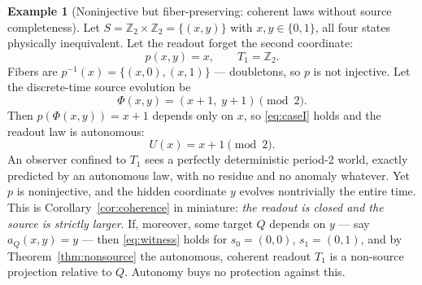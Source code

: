 \documentclass[11pt,reqno]{amsart}
\theoremstyle{plain}
\theoremstyle{definition}
\newtheorem{example}[theorem]{Example}
\theoremstyle{remark}
\begin{document}
\begin{example}[Noninjective but fiber-preserving: coherent laws without source completeness]\label{ex:fiberpreserving}
Let $S=\mathbb Z_2\times\mathbb Z_2=\{(x,y)\}$ with $x,y\in\{0,1\}$, all four states physically inequivalent. Let the readout forget the second coordinate:
\[
p(x,y)=x,\qquad T_1=\mathbb Z_2 .
\]
Fibers are $p^{-1}(x)=\{(x,0),(x,1)\}$ --- doubletons, so $p$ is not injective. Let the discrete-time source evolution be
\[
\Phi(x,y)=(x+1,\;y+1)\pmod 2 .
\]
Then $p(\Phi(x,y))=x+1$ depends only on $x$, so \eqref{eq:caseI} holds and the readout law is autonomous:
\[
U(x)=x+1\pmod 2 .
\]
An observer confined to $T_1$ sees a perfectly deterministic period-2 world, exactly predicted by an autonomous law, with no residue and no anomaly whatever. Yet $p$ is noninjective, and the hidden coordinate $y$ evolves nontrivially the entire time. This is Corollary~\ref{cor:coherence} in miniature: \emph{the readout is closed and the source is strictly larger}. If, moreover, some target $Q$ depends on $y$ --- say $a_Q(x,y)=y$ --- then \eqref{eq:witness} holds for $s_0=(0,0)$, $s_1=(0,1)$, and by Theorem~\ref{thm:nonsource} the autonomous, coherent readout $T_1$ is a non-source projection relative to $Q$. Autonomy buys no protection against this.
\end{example}
\end{document}
